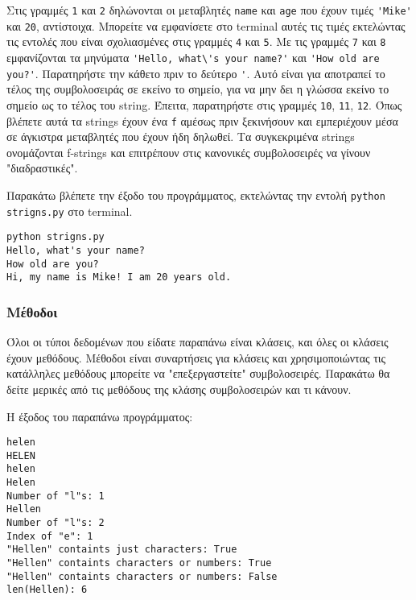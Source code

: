 \documentclass[14pt]{extreport}
\begin{document}


Στις γραμμές \lstinline{1} και \lstinline{2} δηλώνονται οι μεταβλητές \lstinline{name} και \lstinline{age} που έχουν τιμές \lstinline{'Mike'} και \lstinline{20}, αντίστοιχα. Μπορείτε να εμφανίσετε στο terminal αυτές τις τιμές εκτελώντας τις εντολές που είναι σχολιασμένες στις γραμμές \lstinline{4} και \lstinline{5}. Με τις γραμμές \lstinline{7} και \lstinline{8} εμφανίζονται τα μηνύματα \lstinline{'Hello, what\'s your name?'} και \lstinline{'How old are you?'}. Παρατηρήστε την κάθετο πριν το δεύτερο \lstinline{'}. Αυτό είναι για αποτραπεί το τέλος της συμβολοσειράς σε εκείνο το σημείο, για να μην δει η γλώσσα εκείνο το σημείο ως το τέλος του string. Έπειτα, παρατηρήστε στις γραμμές \lstinline{10}, \lstinline{11}, \lstinline{12}. Όπως βλέπετε αυτά τα strings έχουν ένα \lstinline{f} αμέσως πριν ξεκινήσουν και εμπεριέχουν μέσα σε άγκιστρα μεταβλητές που έχουν ήδη δηλωθεί. Τα συγκεκριμένα strings ονομάζονται f-strings και επιτρέπουν στις κανονικές συμβολοσειρές να γίνουν "διαδραστικές".

Παρακάτω βλέπετε την έξοδο του προγράμματος, εκτελώντας την εντολή \lstinline{python strigns.py} στο terminal.

\begin{lstlisting}[language={}]
python strigns.py
Hello, what's your name?
How old are you?
Hi, my name is Mike! I am 20 years old.
\end{lstlisting}

\subsubsection{Μέθοδοι}

Όλοι οι τύποι δεδομένων που είδατε παραπάνω είναι κλάσεις, και όλες οι κλάσεις έχουν μεθόδους. Μέθοδοι είναι συναρτήσεις για κλάσεις και χρησιμοποιώντας τις κατάλληλες μεθόδους μπορείτε να "επεξεργαστείτε" συμβολοσειρές. Παρακάτω θα δείτε μερικές από τις μεθόδους της κλάσης συμβολοσειρών και τι κάνουν.




Η έξοδος του παραπάνω προγράμματος:

\begin{lstlisting}[language={}]
helen
HELEN
helen
Helen
Number of "l"s: 1
Hellen
Number of "l"s: 2
Index of "e": 1
"Hellen" containts just characters: True
"Hellen" containts characters or numbers: True
"Hellen" containts characters or numbers: False
len(Hellen): 6
\end{lstlisting}
\end{document}
